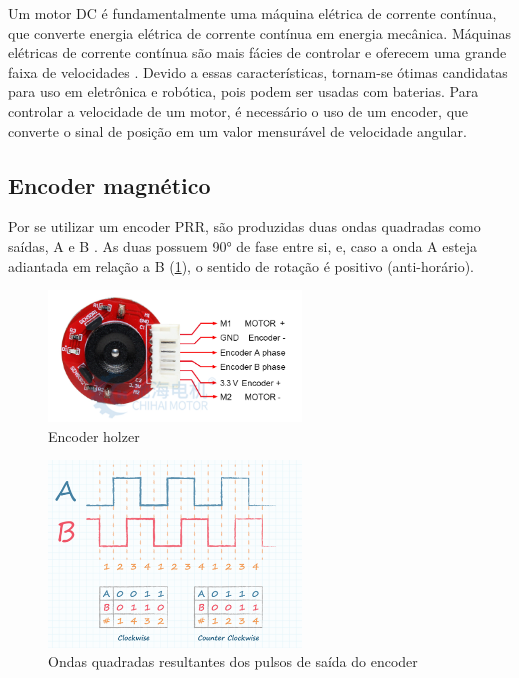 
Um motor DC é fundamentalmente uma máquina elétrica de corrente contínua, que
converte energia elétrica de corrente contínua em energia mecânica. Máquinas
elétricas de corrente contínua são mais fácies de controlar e oferecem uma
grande faixa de velocidades \cite{Maquinas_eletricas}. Devido a essas
características, tornam-se ótimas candidatas para uso em eletrônica e robótica,
pois podem ser usadas com baterias. Para controlar a velocidade de um motor,
é necessário o uso de um encoder, que converte o sinal de posição em um valor
mensurável de velocidade angular.



\subsection{Encoder magnético}

	Por se utilizar um encoder PRR, são produzidas duas ondas quadradas como saídas,
	A e B \cite{encoder_ppr}. As duas possuem 90° de fase entre si, e, caso a onda A
	esteja adiantada em relação a B (\ref{encoder_ppr_ab}), o sentido de rotação é
	positivo (anti-horário).

\begin{figure}[h]
	\centering
	\includegraphics[width=0.6\textwidth]{figures/encoder_holzer}
	\caption{Encoder holzer \cite{motor_dc_6v_encoder}}
\end{figure}

\begin{figure}[h]
	\centering
	\includegraphics[width=0.6\textwidth]{figures/encoder_pulso_ab}
	\caption{Ondas quadradas resultantes dos pulsos de saída do encoder \cite{encoder_ppr}}
	\label{encoder_ppr_ab}
\end{figure}


